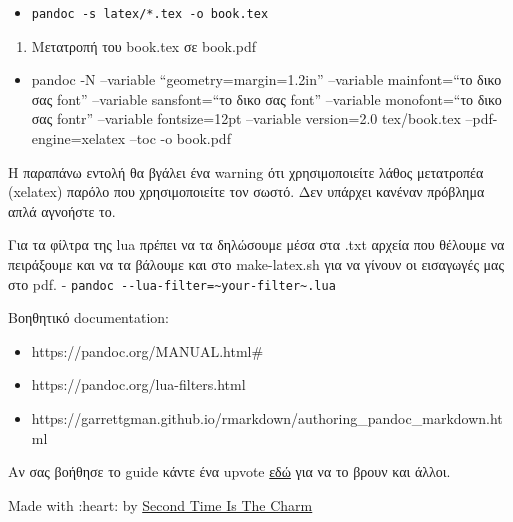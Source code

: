 \documentclass[
]{article}
\begin{document}
\begin{itemize}
\item
  \texttt{pandoc~-s~latex/*.tex~-o~book.tex}
\end{itemize}

\begin{enumerate}
\item
  Μετατροπή του book.tex σε book.pdf
\end{enumerate}

\begin{itemize}
\item
  pandoc -N --variable ``geometry=margin=1.2in'' --variable
  mainfont=``το δικο σας font'' --variable sansfont=``το δικο σας font''
  --variable monofont=``το δικο σας fontr'' --variable fontsize=12pt
  --variable version=2.0 tex/book.tex --pdf-engine=xelatex --toc -o
  book.pdf
\end{itemize}

Η παραπάνω εντολή θα βγάλει ένα warning ότι χρησιμοποιείτε λάθος
μετατροπέα (xelatex) παρόλο που χρησιμοποιείτε τον σωστό. Δεν υπάρχει
κανέναν πρόβλημα απλά αγνοήστε το.

Για τα φίλτρα της lua πρέπει να τα δηλώσουμε μέσα στα .txt αρχεία που
θέλουμε να πειράξουμε και να τα βάλουμε και στο make-latex.sh για να
γίνουν οι εισαγωγές μας στο pdf. -
\texttt{pandoc~-\/-lua-filter=\textasciitilde{}your-filter\textasciitilde{}.lua}

Βοηθητικό documentation:

\begin{itemize}
\item
  https://pandoc.org/MANUAL.html\#
\item
  https://pandoc.org/lua-filters.html
\item
  https://garrettgman.github.io/rmarkdown/authoring\_pandoc\_markdown.html
\end{itemize}

Αν σας βοήθησε το guide κάντε ένα upvote
\href{https://github.com/courses-ionio/help/discussions/1151}{εδώ} για
να το βρουν και άλλοι.

Made with :heart: by
\href{https://github.com/Second-Time-Is-The-Charm/}{Second Time Is The
Charm}
\end{document}
